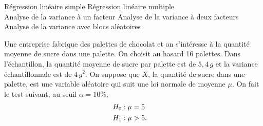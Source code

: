 \begin{questions}
\begin{parts}
\medskip
\begin{oneparcheckboxes}
\choice Régression linéaire simple \hspace{1.48cm}
\choice Régression linéaire multiple \\
\choice Analyse de la variance à un facteur
\choice Analyse de la variance à deux facteurs \\
\CorrectChoice Analyse de la variance avec blocs aléatoires\medskip
\end{oneparcheckboxes}


\end{parts}

\medskip

\question\label{1FQCM}

Une entreprise fabrique des palettes de chocolat et on s'intéresse à la quantité moyenne de sucre dans une palette.  On choisit au hasard 16 palettes. Dans l'échantillon, la quantité moyenne de sucre par palette est de $5,4 \,g$ et la variance échantillonnale est de $4 \, g^2$. On suppose que $X$, la quantité de sucre dans une palette, est une variable aléatoire qui suit une loi normale de moyenne $\mu$. On fait le test suivant, au seuil $\alpha=10\%$,
\begin{align*}
	H_0 &: \mu = 5 \cr
	H_1 &: \mu > 5.
\end{align*}

\end{questions}
